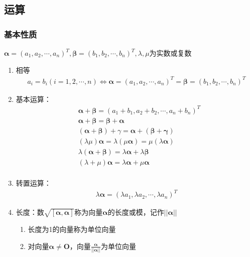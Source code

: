 \documentclass[12pt]{book}
\begin{document}
\subsection{运算}



\subsubsection{基本性质}


$\bm{\alpha}=(a_{1},a_{2},\cdots,a_{n})^T, \bm{\beta}=(b_1,b_2,\cdots,b_n)^T, \lambda,\mu $为实数或复数

\begin{enumerate}[1.]
    \item 相等
          \begin{gather*}
              a_i=b_i(i=1,2,\cdots,n) \Leftrightarrow \bm{\alpha}=(a_1,a_2,\cdots,a_n)^{T} = \bm{\beta} = (b_1,b_2,\cdots,b_n)^T
          \end{gather*}
    \item 基本运算：
          \begin{align*}
               & \bm{\alpha}+\bm{\beta} = (a_1+b_1,a_2+b_2,\cdots,a_n+b_n)^T                 \\
               & \bm{\alpha}+\bm{\beta} =\bm{\beta}+\bm{\alpha}                              \\
               & (\bm{\alpha}+\bm{\beta})+\gamma = \bm{\alpha}+(\bm{\beta}+\bm{\gamma})      \\
               & (\lambda\mu)\bm{\alpha} = \lambda(\mu\bm{\alpha}) = \mu(\lambda\bm{\alpha}) \\
               & \lambda(\bm{\alpha}+\bm{\beta})=\lambda\bm{\alpha}+\lambda\bm{\beta}        \\
               & (\lambda+\mu)\bm{\alpha} = \lambda\bm{\alpha}+\mu\bm{\alpha}                \\
          \end{align*}
    \item 转置运算：
          \begin{gather*}
              \lambda\bm{\alpha}=(\lambda a_{1},\lambda a_2, \cdots, \lambda a_n)^T
          \end{gather*}
    \item 长度：数$\sqrt{[\bm{\alpha},\bm{\alpha}]}$称为向量$\bm{\alpha}$的长度或模，记作$||\bm{\alpha}||$
    \begin{enumerate}[(1)]
        \item 长度为1的向量称为单位向量
        \item 对向量$\bm{\alpha}\neq \bm{O}$，向量$\frac{\bm{\alpha}}{||\bm{\alpha}||}$为单位向量
    \end{enumerate}
\end{enumerate}
\end{document}
